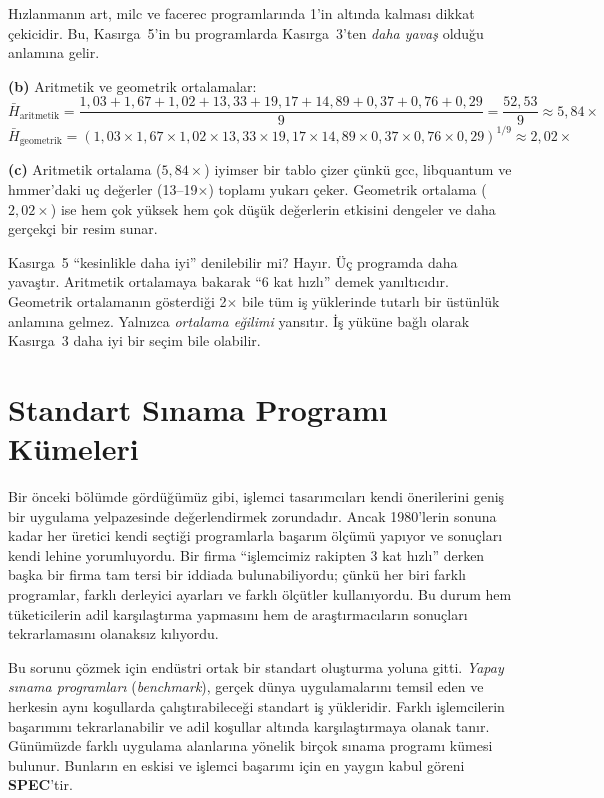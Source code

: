 \begin{ornek}[2.8]
Hızlanmanın art, milc ve facerec programlarında 1'in altında kalması dikkat çekicidir. Bu, Kasırga~5'in bu programlarda Kasırga~3'ten \emph{daha yavaş} olduğu anlamına gelir.

\textbf{(b)} Aritmetik ve geometrik ortalamalar:
\[
\bar{H}_{\text{aritmetik}} = \frac{1{,}03 + 1{,}67 + 1{,}02 + 13{,}33 + 19{,}17 + 14{,}89 + 0{,}37 + 0{,}76 + 0{,}29}{9} = \frac{52{,}53}{9} \approx 5{,}84\times
\]
\[
\bar{H}_{\text{geometrik}} = (1{,}03 \times 1{,}67 \times 1{,}02 \times 13{,}33 \times 19{,}17 \times 14{,}89 \times 0{,}37 \times 0{,}76 \times 0{,}29)^{1/9} \approx 2{,}02\times
\]

\textbf{(c)} Aritmetik ortalama ($5{,}84\times$) iyimser bir tablo çizer çünkü gcc, libquantum ve hmmer'daki uç değerler (13--19$\times$) toplamı yukarı çeker. Geometrik ortalama ($2{,}02\times$) ise hem çok yüksek hem çok düşük değerlerin etkisini dengeler ve daha gerçekçi bir resim sunar.

Kasırga~5 ``kesinlikle daha iyi'' denilebilir mi? Hayır. Üç programda daha yavaştır. Aritmetik ortalamaya bakarak ``6 kat hızlı'' demek yanıltıcıdır. Geometrik ortalamanın gösterdiği 2$\times$ bile tüm iş yüklerinde tutarlı bir üstünlük anlamına gelmez. Yalnızca \emph{ortalama eğilimi} yansıtır. İş yüküne bağlı olarak Kasırga~3 daha iyi bir seçim bile olabilir.
\end{ornek}



\section{Standart Sınama Programı Kümeleri}
\label{sec:yapay-sinama}

Bir önceki bölümde gördüğümüz gibi, işlemci tasarımcıları kendi önerilerini geniş bir uygulama yelpazesinde değerlendirmek zorundadır. Ancak 1980'lerin sonuna kadar her üretici kendi seçtiği programlarla başarım ölçümü yapıyor ve sonuçları kendi lehine yorumluyordu. Bir firma ``işlemcimiz rakipten 3 kat hızlı'' derken başka bir firma tam tersi bir iddiada bulunabiliyordu; çünkü her biri farklı programlar, farklı derleyici ayarları ve farklı ölçütler kullanıyordu. Bu durum hem tüketicilerin adil karşılaştırma yapmasını hem de araştırmacıların sonuçları tekrarlamasını olanaksız kılıyordu.

Bu sorunu çözmek için endüstri ortak bir standart oluşturma yoluna gitti. \emph{Yapay sınama programları} (\emph{benchmark}), gerçek dünya uygulamalarını temsil eden ve herkesin aynı koşullarda çalıştırabileceği standart iş yükleridir. Farklı işlemcilerin başarımını tekrarlanabilir ve adil koşullar altında karşılaştırmaya olanak tanır. Günümüzde farklı uygulama alanlarına yönelik birçok sınama programı kümesi bulunur. Bunların en eskisi ve işlemci başarımı için en yaygın kabul göreni \textbf{SPEC}'tir.


